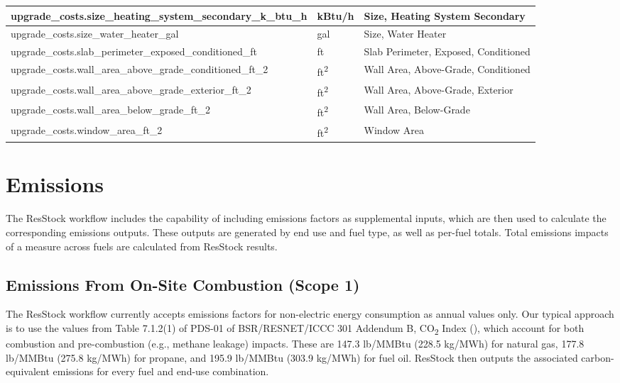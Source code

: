 \begin{longtable}[]{ |p{}|p{2.5cm}|p{7.2cm}| }
upgrade\_costs.size\_heating\_system\_secondary\_k\_btu\_h & kBtu/h & Size, Heating System Secondary \\ \hline
upgrade\_costs.size\_water\_heater\_gal & gal & Size, Water Heater \\ \hline
upgrade\_costs.slab\_perimeter\_exposed\_conditioned\_ft & ft & Slab Perimeter, Exposed, Conditioned \\ \hline
upgrade\_costs.wall\_area\_above\_grade\_conditioned\_ft\_2 & ft\textsuperscript{2}& Wall Area, Above-Grade, Conditioned \\ \hline
upgrade\_costs.wall\_area\_above\_grade\_exterior\_ft\_2 & ft\textsuperscript{2}& Wall Area, Above-Grade, Exterior \\ \hline
upgrade\_costs.wall\_area\_below\_grade\_ft\_2 & ft\textsuperscript{2}& Wall Area, Below-Grade \\ \hline
upgrade\_costs.window\_area\_ft\_2 & ft\textsuperscript{2}& Window Area
\end{longtable}

\section{Emissions}
The ResStock workflow includes the capability of including emissions factors as supplemental inputs, which are then used to calculate the corresponding emissions outputs. These outputs are generated by end use and fuel type, as well as per-fuel totals. Total emissions impacts of a measure across fuels are calculated from ResStock results.

\subsection{Emissions From On-Site Combustion (Scope 1)}
The ResStock workflow currently accepts emissions factors for non-electric energy consumption as annual values only. Our typical approach is to use the values from Table 7.1.2(1) of PDS-01 of BSR/RESNET/ICCC 301 Addendum B, CO\textsubscript{2} Index (\cite{RESNET2022}), which account for both combustion and pre-combustion (e.g., methane leakage) impacts. These are 147.3 lb/MMBtu (228.5 kg/MWh) for natural gas, 177.8 lb/MMBtu (275.8 kg/MWh) for propane, and 195.9 lb/MMBtu (303.9 kg/MWh) for fuel oil. ResStock then outputs the associated carbon-equivalent emissions for every fuel and end-use combination. 

